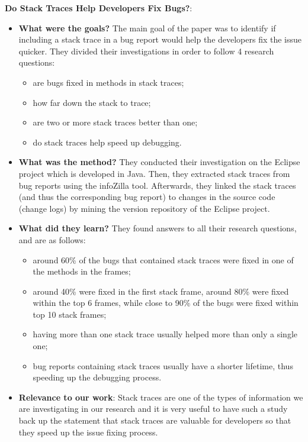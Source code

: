 \documentclass{mprop}
\begin{document}
\textbf{Do Stack Traces Help Developers Fix Bugs?}\cite{schroter2010stack}:
\begin{itemize}
  \item \textbf{What were the goals?}
    The main goal of the paper was to identify if including a stack trace in a 
    bug report would help the developers fix the issue quicker. They divided their
    investigations in order to follow 4 research questions:
      \begin{itemize}
        \item are bugs fixed in methods in stack traces;
        \item how far down the stack to trace;
        \item are two or more stack traces better than one;
        \item do stack traces help speed up debugging.
      \end{itemize}
  \item \textbf{What was the method?}
    They conducted their investigation on the Eclipse project which is developed in
    Java. Then, they extracted stack traces from bug reports using the infoZilla tool.
    Afterwards, they linked the stack traces (and thus the corresponding bug report)
    to changes in the source code (change logs) by mining the version repository of the
    Eclipse project.
  \item \textbf{What did they learn?}
    They found answers to all their research questions, and are as follows:
      \begin{itemize}
        \item around 60\% of the bugs that contained stack traces were fixed in 
        one of the methods in the frames;
        \item around 40\% were fixed in the first stack frame, around 80\% were fixed
        within the top 6 frames, while close to 90\% of the bugs were fixed within top 10 stack frames;
        \item having more than one stack trace usually helped more than only a single one;
        \item bug reports containing stack traces usually have a shorter lifetime, thus
        speeding up the debugging process.
      \end{itemize}
  \item \textbf{Relevance to our work}:
    Stack traces are one of the types of information we are investigating in our research
    and it is very useful to have such a study back up the statement that stack traces are
    valuable for developers so that they speed up the issue fixing process.
\end{itemize}
\end{document}
